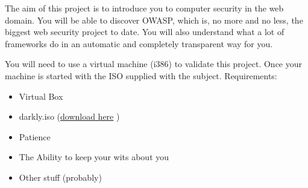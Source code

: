 The aim of this project is to introduce you to computer security in the web domain.
You will be able to discover OWASP, which is, no more and no less, the biggest web
security project to date.
You will also understand what a lot of frameworks do in an automatic and completely
transparent way for you.

You will need to use a virtual machine 
(i386) to validate this project. Once your
machine is started with the ISO supplied with the subject.
Requirements:
\begin{itemize}
    \item Virtual Box
    \item darkly.iso (\href{https://drive.google.com/file/d/145dbZHjZWyMiRscj-72jE3n5PM5vXyB9/view?usp=sharing}{download here} )
    \item Patience
    \item The Ability to keep your wits about you
    \item Other stuff (probably)
\end{itemize}

%